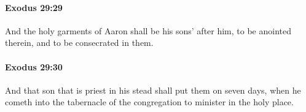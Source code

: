 		\paragraph{Exodus 29:29} %
			\label{EXODUS-29-29}

			And the holy garments of Aaron shall be his sons' after him, to be anointed therein, and to be consecrated in them.


		\paragraph{Exodus 29:30} %
			\label{EXODUS-29-30}

			And that son that is priest in his stead shall put them on seven days, when he cometh into the tabernacle of the congregation to minister in the holy place.


